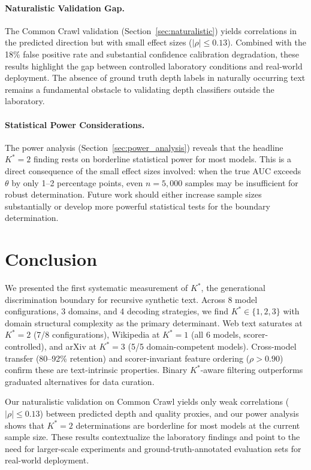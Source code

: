 \documentclass[11pt,a4paper]{article}
\begin{document}
\paragraph{Naturalistic Validation Gap.}
The Common Crawl validation (Section~\ref{sec:naturalistic}) yields correlations in the predicted direction but with small effect sizes ($|\rho| \leq 0.13$). Combined with the 18\% false positive rate and substantial confidence calibration degradation, these results highlight the gap between controlled laboratory conditions and real-world deployment. The absence of ground truth depth labels in naturally occurring text remains a fundamental obstacle to validating depth classifiers outside the laboratory.

\paragraph{Statistical Power Considerations.}
The power analysis (Section~\ref{sec:power_analysis}) reveals that the headline $K^*=2$ finding rests on borderline statistical power for most models. This is a direct consequence of the small effect sizes involved: when the true AUC exceeds $\theta$ by only 1--2 percentage points, even $n=5{,}000$ samples may be insufficient for robust determination. Future work should either increase sample sizes substantially or develop more powerful statistical tests for the boundary determination.

\section{Conclusion}

We presented the first systematic measurement of $K^*$, the generational discrimination boundary for recursive synthetic text. Across 8 model configurations, 3 domains, and 4 decoding strategies, we find $K^* \in \{1, 2, 3\}$ with domain structural complexity as the primary determinant. Web text saturates at $K^*=2$ (7/8 configurations), Wikipedia at $K^*=1$ (all 6 models, scorer-controlled), and arXiv at $K^*=3$ (5/5 domain-competent models). Cross-model transfer (80--92\% retention) and scorer-invariant feature ordering ($\rho > 0.90$) confirm these are text-intrinsic properties. Binary $K^*$-aware filtering outperforms graduated alternatives for data curation.

Our naturalistic validation on Common Crawl yields only weak correlations ($|\rho| \leq 0.13$) between predicted depth and quality proxies, and our power analysis shows that $K^*=2$ determinations are borderline for most models at the current sample size. These results contextualize the laboratory findings and point to the need for larger-scale experiments and ground-truth-annotated evaluation sets for real-world deployment.
\end{document}

